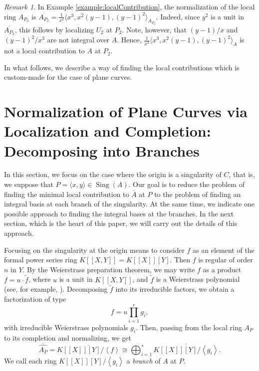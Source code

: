 \documentclass[a4paper,11pt]{amsart}%
\theoremstyle{definition}
\theoremstyle{plain}
\theoremstyle{remark}
\newtheorem{remark}[defn]{Remark}
\DeclareMathOperator{\Sing}{Sing}
\begin{document}
\begin{remark}
In Example \ref{example:localContribution}, the normalization of
the local ring $A_{P_2}$ is $\overline{A_{P_2}}=
\frac{1}{x^3}\langle x^3, x^2(y-1), (y-1)^2\rangle_{A_{P_2}}$. Indeed,
since $y^2$ is a unit in $\overline{A_{P_2}}$, this follows by localizing
$U_2$ at $P_2$. Note, however, that $(y-1)/x$ and $(y-1)^2/x^3$ 
are not integral over $A$. Hence, $\frac{1}{x^3}\langle x^3, x^2(y-1), 
(y-1)^2\rangle_{A}$ is not a local contribution to $A$ at $P_2$.
\end{remark}

In what follows, we describe a way of finding the local contributions which is
custom-made for the case of plane curves.

\section{Normalization of Plane Curves via Localization and Completion: 
Decomposing into Branches}
\label{sect:norm-via-loc-and-compl-the-theory}



In this section, we focus on the case where the origin is a singularity of 
$C$, that is, we suppose that $P=\langle x,y \rangle \in \Sing(A)$. Our
goal is to reduce the problem of finding the minimal local contribution 
to $\overline{A}$ at $P$ to the problem of finding an integral basis at 
each branch of the singularity. At the same 
time, we indicate one possible approach to finding the integral bases
at the branches. In the next section, which is the heart of this paper,
we will carry out the details of this approach.

Focusing on the singularity at the origin means to consider $f$ as
an element of the formal power series ring $K[[X,Y]]=K[[X]][Y]$. Then $f$ is
regular of order $n$ in $Y$. By the Weierstrass preparation theorem,
we may write $f$ as a product $f = u \cdot \widetilde{f}$, where $u$ is a unit
in $K[[X,Y]]$, and $\widetilde{f}$ is a Weierstrass polynomial (see, for 
example, \cite{JP}). Decomposing $\widetilde{f}$ into its irreducible factors, we 
obtain a factorization of type
$$
f = u \prod_{i=1}^{r} g_{i},
$$
with irreducible Weierstrass polynomials $g_i$. Then, passing from the
local ring $A_P$ to its completion and normalizing, we get
$$
\overline{\widehat{A_P}} =\overline{K[[X]][Y]/\left\langle f\right\rangle} \cong
\bigoplus_{i=1}^s \overline{K[[X]][Y]/\left\langle g_i\right\rangle}.
$$
We call each ring $K[[X]][Y]/\left\langle g_i\right\rangle$ a \emph{branch} of $A$
at $P$.
\end{document}
